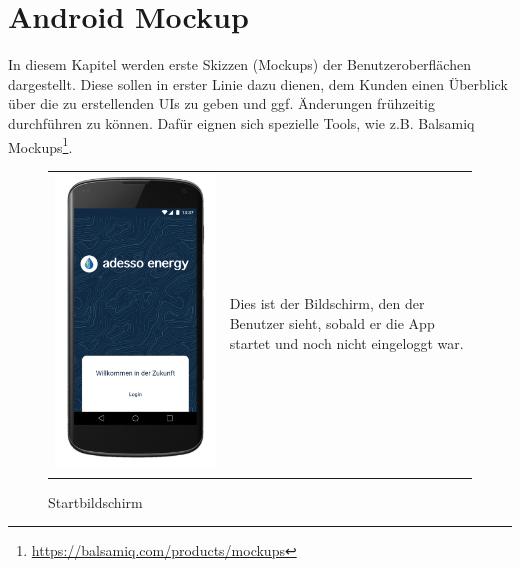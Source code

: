 \section{Android Mockup}

\begin{tcolorbox}
In diesem Kapitel werden erste Skizzen (Mockups) der Benutzeroberflächen dargestellt.
Diese sollen in erster Linie dazu dienen, dem Kunden einen Überblick über die zu erstellenden UIs zu geben und ggf. Änderungen frühzeitig durchführen zu können.
Dafür eignen sich spezielle Tools, wie z.B. Balsamiq Mockups\footnote{\url{https://balsamiq.com/products/mockups}}.
\end{tcolorbox}


\begin{figure}[h]
\begin{tabularx}{\textwidth}{X  X}
	\includegraphics[scale = 0.155]{img/AndroidMockup/splash}  \caption {Startbildschirm} &  Dies ist der Bildschirm, den der Benutzer sieht, sobald er die App startet und noch nicht eingeloggt war.\\

\end{tabularx}
\end{figure}
